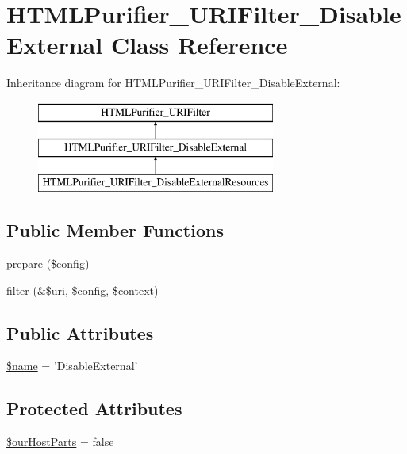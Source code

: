 \hypertarget{classHTMLPurifier__URIFilter__DisableExternal}{\section{H\+T\+M\+L\+Purifier\+\_\+\+U\+R\+I\+Filter\+\_\+\+Disable\+External Class Reference}
\label{classHTMLPurifier__URIFilter__DisableExternal}
}
Inheritance diagram for H\+T\+M\+L\+Purifier\+\_\+\+U\+R\+I\+Filter\+\_\+\+Disable\+External\+:\begin{figure}[H]
\begin{center}
\leavevmode
\includegraphics[height=3.000000cm]{classHTMLPurifier__URIFilter__DisableExternal}
\end{center}
\end{figure}
\subsection*{Public Member Functions}
\begin{DoxyCompactItemize}
\item 
\hyperlink{classHTMLPurifier__URIFilter__DisableExternal_a34bcd491757572cad0f14587967a1c88}{prepare} (\$config)
\item 
\hyperlink{classHTMLPurifier__URIFilter__DisableExternal_add4e3c847f2b5f12ada15fe0948188d1}{filter} (\&\$uri, \$config, \$context)
\end{DoxyCompactItemize}
\subsection*{Public Attributes}
\begin{DoxyCompactItemize}
\item 
\hyperlink{classHTMLPurifier__URIFilter__DisableExternal_ad3995a91603ac1f0f69c70cafa823481}{\$name} = 'Disable\+External'
\end{DoxyCompactItemize}
\subsection*{Protected Attributes}
\begin{DoxyCompactItemize}
\item 
\hyperlink{classHTMLPurifier__URIFilter__DisableExternal_af6a300b222528c011e2908fc2398552b}{\$our\+Host\+Parts} = false
\end{DoxyCompactItemize}


